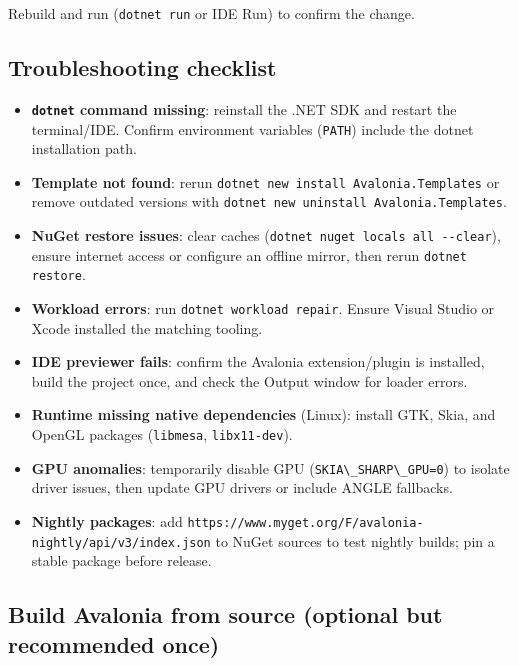 Rebuild and run (\passthrough{\lstinline!dotnet run!} or IDE Run) to
confirm the change.

\subsection{Troubleshooting checklist}\label{troubleshooting-checklist}

\begin{itemize}
\tightlist
\item
  \textbf{\passthrough{\lstinline!dotnet!} command missing}: reinstall
  the .NET SDK and restart the terminal/IDE. Confirm environment
  variables (\passthrough{\lstinline!PATH!}) include the dotnet
  installation path.
\item
  \textbf{Template not found}: rerun
  \passthrough{\lstinline!dotnet new install Avalonia.Templates!} or
  remove outdated versions with
  \passthrough{\lstinline!dotnet new uninstall Avalonia.Templates!}.
\item
  \textbf{NuGet restore issues}: clear caches
  (\passthrough{\lstinline!dotnet nuget locals all --clear!}), ensure
  internet access or configure an offline mirror, then rerun
  \passthrough{\lstinline!dotnet restore!}.
\item
  \textbf{Workload errors}: run
  \passthrough{\lstinline!dotnet workload repair!}. Ensure Visual Studio
  or Xcode installed the matching tooling.
\item
  \textbf{IDE previewer fails}: confirm the Avalonia extension/plugin is
  installed, build the project once, and check the Output window for
  loader errors.
\item
  \textbf{Runtime missing native dependencies} (Linux): install GTK,
  Skia, and OpenGL packages (\passthrough{\lstinline!libmesa!},
  \passthrough{\lstinline!libx11-dev!}).
\item
  \textbf{GPU anomalies}: temporarily disable GPU
  (\passthrough{\lstinline!SKIA\_SHARP\_GPU=0!}) to isolate driver
  issues, then update GPU drivers or include ANGLE fallbacks.
\item
  \textbf{Nightly packages}: add
  \passthrough{\lstinline!https://www.myget.org/F/avalonia-nightly/api/v3/index.json!}
  to NuGet sources to test nightly builds; pin a stable package before
  release.
\end{itemize}

\subsection{Build Avalonia from source (optional but recommended
once)}\label{build-avalonia-from-source-optional-but-recommended-once}

